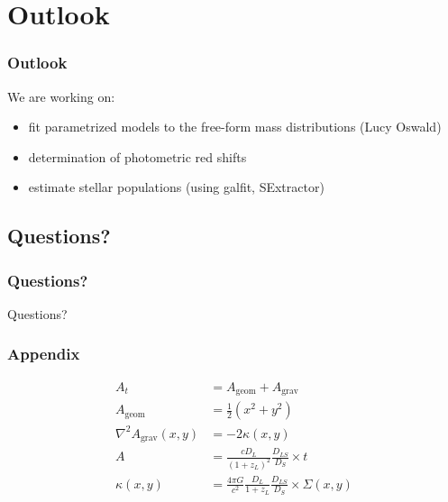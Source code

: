 \documentclass[aspectratio=1610]{beamer}
\begin{document}
%






\section{Outlook}

\begin{frame}
  \frametitle{Outlook}
  We are working on:
  \begin{itemize}
  	\item fit parametrized models to the free-form mass distributions (Lucy Oswald)
    \item determination of photometric red shifts
    \item estimate stellar populations (using galfit, SExtractor)
  \end{itemize}
\end{frame}



\subsection*{Questions?}

\begin{frame}
  \frametitle{Questions?}
  Questions?
\end{frame}




\appendix

\begin{frame}
  \frametitle{Appendix}
\end{frame}

\begin{frame}
  \begin{align}
    A_t &= A_\text{geom} + A_\text{grav}\\
    A_\text{geom} &= \frac{1}{2}\left(x^2+y^2\right)\\
    \nabla^2 A_\text{grav}\left(x,y\right) &= -2\kappa\left(x,y\right)\\
    A           &= \frac{cD_L}{(1+z_L)^2} \frac{D_{LS}}{D_S} \times t \\
    \kappa(x,y) &= \frac{4\pi G}{c^2} \frac{D_L}{1+z_L} \frac{D_{LS}}{D_S} \times \Sigma(x,y)
  \end{align}
  
\end{frame}
\end{document}
